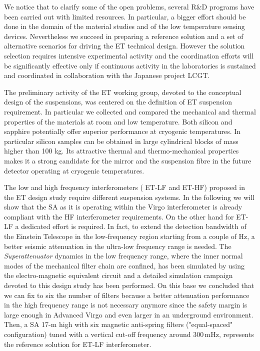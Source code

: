 We notice that to clarify some of the open problems, several R\&D programs have been 
carried out with limited resources. In particular, a bigger effort should be done 
in the domain of the material studies and of the low temperature  sensing devices.  
Nevertheless we succeed in preparing a reference solution and a set of alternative 
scenarios for driving the ET technical design. However the solution selection 
requires intensive experimental activity and the coordination efforts will be  
significantly effective only if continuous activity in the laboratories is sustained 
and coordinated in collaboration with the Japanese project LCGT.

The preliminary activity of the ET working group, devoted to the conceptual design 
of the suspensions, was centered on the definition of ET suspension requirement. 
In particular we collected and compared the mechanical and thermal properties of 
the materials at room and low temperature. 
Both silicon and sapphire potentially offer superior performance at cryogenic temperatures. 
In particular silicon samples can be obtained in large cylindrical blocks of mass higher 
than 100 kg. Its attractive thermal and thermo-mechanical properties makes it a strong 
candidate for the mirror and the suspension fibre in the future detector operating 
at cryogenic temperatures. 

\medskip

The low and high frequency interferometers ( ET-LF and ET-HF) proposed in the ET 
design study require different suspension systems. In the following we will show 
that the SA as it is operating within the Virgo interferometer is already compliant 
with the HF interferometer requirements. On the other hand for  ET-LF a dedicated 
effort is required. In fact, to extend the detection bandwidth of the Einstein 
Telescope in the low-frequency region starting from a couple of Hz, a better seismic 
attenuation in the ultra-low frequency range is needed. 
The \emph{Superattenuator} dynamics in the low frequency range, where the inner 
normal modes of the mechanical filter chain are confined, has been simulated by 
using the electro-magnetic equivalent circuit and a detailed simulation campaign 
devoted to this design study has been performed. On this base we concluded that 
we can fix to six the number of filters because a better attenuation performance 
in the high frequency range is not necessary anymore since the safety margin is 
large enough in Advanced Virgo and even larger in an underground environment. 
Then, a SA 17-m high with six magnetic anti-spring filters ("equal-spaced" 
configuration) tuned with a vertical cut-off frequency around 300\,mHz, represents 
the reference solution for  ET-LF interferometer. 

